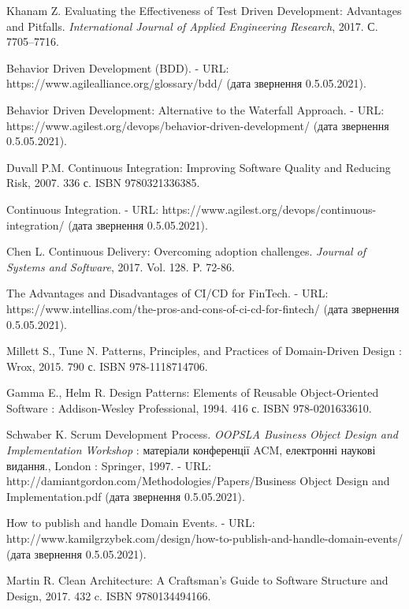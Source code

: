 \begin{thebibliography}{00}
			Khanam Z.
			Evaluating the Effectiveness of Test Driven Development: Advantages and Pitfalls.
      \emph{International Journal of Applied Engineering Research},
      2017. С. 7705–7716.
	
			Behavior Driven Development (BDD). -
			URL: https://www.agilealliance.org/glossary/bdd/
			(дата звернення 0.5.05.2021).

			Behavior Driven Development: Alternative to the Waterfall Approach. -
			URL: https://www.agilest.org/devops/behavior-driven-development/
			(дата звернення 0.5.05.2021).
	
			Duvall P.M. 
			Continuous Integration: Improving Software Quality and Reducing Risk,
			2007. 336 с. ISBN 9780321336385.
	
			Continuous Integration. -
			URL: https://www.agilest.org/devops/continuous-integration/
			(дата звернення 0.5.05.2021).

      Chen L.
      Continuous Delivery: Overcoming adoption challenges.
      \emph{Journal of Systems and Software},
      2017. Vol. 128. P. 72-86.

      The Advantages and Disadvantages of CI/CD for FinTech. -
      URL: https://www.intellias.com/the-pros-and-cons-of-ci-cd-for-fintech/
			(дата звернення 0.5.05.2021).

      Millett S., Tune N.
      Patterns, Principles, and Practices of Domain-Driven Design : Wrox,
      2015. 790 с. ISBN 978-1118714706.

      Gamma E., Helm R.
      Design Patterns: Elements of Reusable Object-Oriented Software : Addison-Wesley Professional,
      1994. 416 с. ISBN 978-0201633610.

			Schwaber K.
      Scrum Development Process.
      \emph{OOPSLA Business Object Design and Implementation Workshop} :
      матеріали конференції ACM, електронні наукові видання.,
      London : Springer, 1997.
      - URL: http://damiantgordon.com/Methodologies/Papers/Business Object Design and Implementation.pdf
			(дата звернення 0.5.05.2021).
	
			How to publish and handle Domain Events. -
			URL: http://www.kamilgrzybek.com/design/how-to-publish-and-handle-domain-events/
			(дата звернення 0.5.05.2021).

			Martin R.
			Clean Architecture: A Craftsman's Guide to Software Structure and Design,
			2017. 432 c. ISBN 9780134494166.
	

\end{thebibliography}
